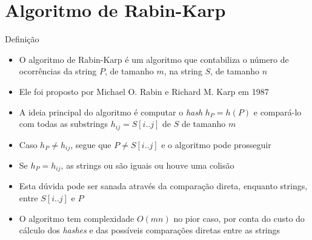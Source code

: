\section{Algoritmo de Rabin-Karp}

\begin{frame}[fragile]{Definição}

    \begin{itemize}
        \item O algoritmo de Rabin-Karp é um algoritmo que contabiliza o número de ocorrências
            da string $P$, de tamanho $m$, na string $S$, de tamanho $n$

        \item Ele foi proposto por Michael O. Rabin e Richard M. Karp em 1987

        \item A ideia principal do algoritmo é computar o \textit{hash} $h_P = h(P)$ e compará-lo
            com todas as substrings $h_{ij} = S[i..j]$ de $S$ de tamanho $m$

        \item Caso $h_P \neq h_{ij}$, segue que $P\neq S[i..j]$ e o algoritmo pode prosseguir

        \item Se $h_P = h_{ij}$, as strings ou são iguais ou houve uma colisão

        \item Esta dúvida pode ser sanada através da comparação direta, enquanto strings, entre
            $S[i..j]$ e $P$

        \item O algoritmo tem complexidade $O(mn)$ no pior caso, por conta do custo do cálculo
            dos {\it hashes} e das possíveis comparações diretas entre as strings

    \end{itemize}

\end{frame}

